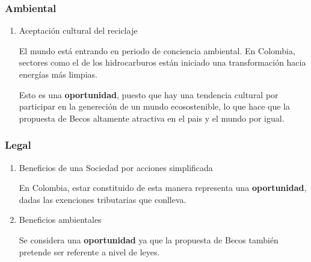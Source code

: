 \documentclass[11pt]{article}
\begin{document}
\subsubsection{Ambiental}
\label{sec:org9187abc}
\begin{enumerate}
\item Aceptación cultural del reciclaje
  \label{sec:orgebeefdc}
  
El mundo está entrando en periodo de conciencia ambiental. En
Colombia, sectores como el de los hidrocarburos están iniciado una
transformación hacia energías más limpias.

Esto es una \textbf{oportunidad}, puesto que hay una tendencia cultural
por participar en la genereción de un mundo ecosostenible, lo
que hace que la propuesta de Becos altamente atractiva en el pais
y el mundo por igual.
\end{enumerate}
\subsubsection{Legal}
\label{sec:org109c92b}
\begin{enumerate}
\item Beneficios de una Sociedad por acciones simplificada
\label{sec:org5580340}

En Colombia, estar constituido de esta manera representa una
\textbf{oportunidad}, dadas las exenciones tributarias que conlleva.

\item Beneficios ambientales
\label{sec:orgf16b6a1}

Se considera una \textbf{oportunidad} ya que la propuesta de Becos también
pretende ser referente a nivel de leyes.
\end{enumerate}
\end{document}
